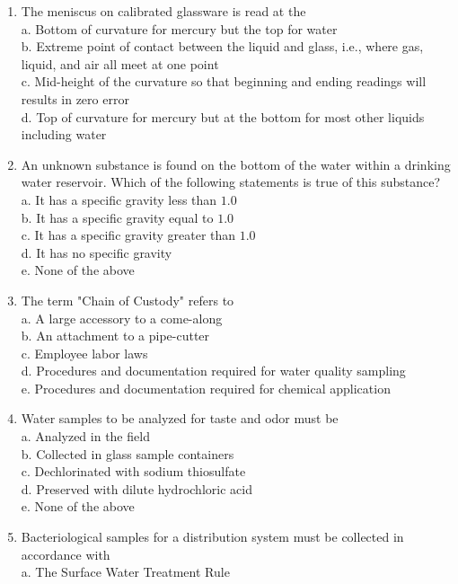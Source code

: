 \documentclass{article}
\begin{document}
\begin{enumerate}[1.]
  \item The meniscus on calibrated glassware is read at the\\
a. Bottom of curvature for mercury but the top for water\\
b. Extreme point of contact between the liquid and glass, i.e., where gas, liquid, and air all meet at one point\\
c. Mid-height of the curvature so that beginning and ending readings will results in zero error\\
d. Top of curvature for mercury but at the bottom for most other liquids including water\\
  \item An unknown substance is found on the bottom of the water within a drinking water reservoir. Which of the following statements is true of this substance?\\
a. It has a specific gravity less than $1.0$\\
b. It has a specific gravity equal to $1.0$\\
c. It has a specific gravity greater than $1.0$\\
d. It has no specific gravity\\
e. None of the above\\
  \item The term "Chain of Custody" refers to\\
a. A large accessory to a come-along\\
b. An attachment to a pipe-cutter\\
c. Employee labor laws\\
d. Procedures and documentation required for water quality sampling\\
e. Procedures and documentation required for chemical application\\
  \item Water samples to be analyzed for taste and odor must be\\
a. Analyzed in the field\\
b. Collected in glass sample containers\\
c. Dechlorinated with sodium thiosulfate\\
d. Preserved with dilute hydrochloric acid\\
e. None of the above\\
  \item Bacteriological samples for a distribution system must be collected in accordance with\\
a. The Surface Water Treatment Rule\\

\end{enumerate}
\end{document}
